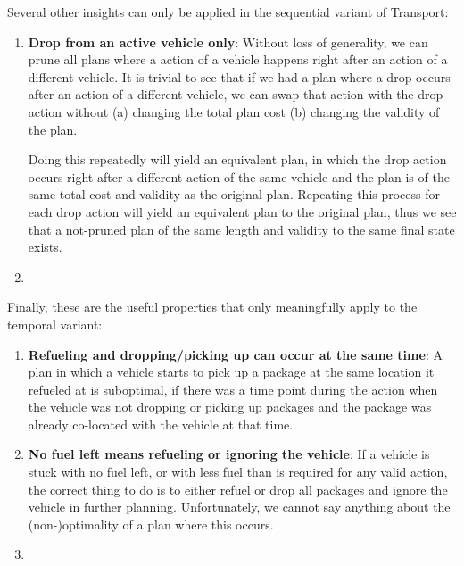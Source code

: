 Several other insights can only be applied in the sequential variant of Transport:
\begin{enumerate}
\item \textbf{Drop from an active vehicle only}: Without loss of generality,
we can prune all plans where a \drop{} action of a vehicle happens
right after an action of a different vehicle. It is trivial to see that if we had a plan where a drop
occurs after an action of a different vehicle, we can swap that action with the drop
action without (a) changing the total plan cost (b) changing the validity of the plan.

Doing this repeatedly will yield an equivalent plan, in which the drop action
occurs right after a different action of the same vehicle and the plan is of the same total cost and validity as the original plan. Repeating this process for each drop action will yield an equivalent plan to the original plan, thus we see that a not-pruned plan of the same length and validity to the same final state exists.

\item \textbf{}
\end{enumerate}
Finally, these are the useful properties that only meaningfully apply to the temporal variant:
\begin{enumerate}
\item \textbf{Refueling and dropping/picking up can occur at the same time}: 
A plan in which a vehicle starts to pick up a package at the same location it refueled at is suboptimal, if there was a time point during the  action
when the vehicle was not dropping or picking up packages and the package was already
co-located with the vehicle at that time.

\item \textbf{No fuel left means refueling or ignoring the vehicle}:
If a vehicle is stuck with no fuel left, or with less fuel than is required for
any valid \drive{} action, the correct thing to do is to either refuel or drop
all packages and ignore the vehicle in further planning. Unfortunately,
we cannot say anything about the (non-)optimality of a plan where this occurs.

\item \textbf{}
\end{enumerate}












